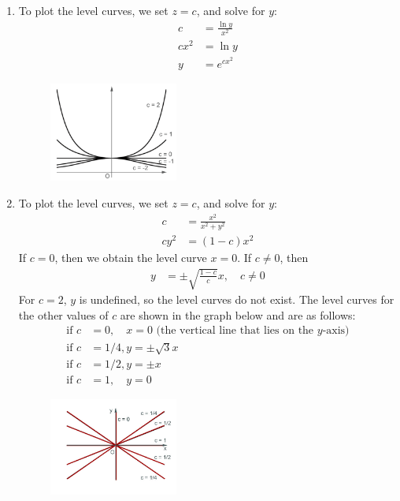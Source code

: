 \item
\begin{enumerate}
\item To plot the level curves, we set $z = c$, and solve for $y$: 
\begin{align*} 
  c &= \frac{\ln y}{x^2} \\
  cx^2&= \ln y \\
  y &= e^{cx^2}
\end{align*}
\begin{figure}[!htbp]
  \begin{center}
    \includegraphics[width=0.4\textwidth]{ImgLevelCurvesA.pdf}
  \end{center}
\end{figure}
\item To plot the level curves, we set $z = c$, and solve for $y$: 
\begin{align*} 
  c &= \frac{x^2}{x^2+y^2} \\
  cy^2 &= (1-c)x^2
\end{align*}
If $c=0$, then we obtain the level curve $x = 0$. If $c \ne0$, then
\begin{align*} 
  y &= \pm \sqrt{\frac{1-c}{c}}x, \quad c \ne0
\end{align*}
For $c=2$, $y$ is undefined, so the level curves do not exist. The level curves for the other values of $c$ are shown in the graph below and are as follows:
\begin{align*} 
  \text{if } c&=0, \quad x = 0 \text{ (the vertical line that lies on the } y \text{-axis})\\
  \text{if } c&=1/4, y = \pm \sqrt{3}x\\
  \text{if } c&=1/2, y = \pm x\\  
  \text{if } c&=1, \quad y = 0    
\end{align*}

\begin{figure}[!htbp]
  \begin{center}
    \includegraphics[width=0.4\textwidth]{ImgLevelCurvesB.jpg}
  \end{center}
\end{figure}

\end{enumerate}
